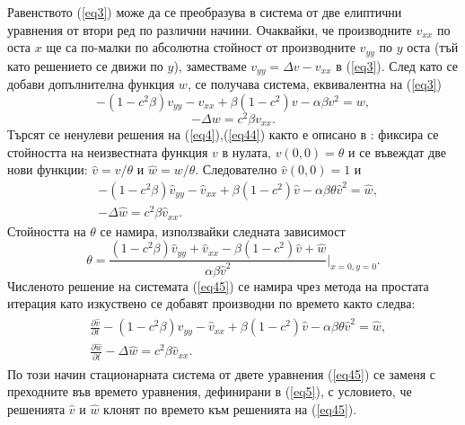 \documentclass[a4paper]{article}
\newcommand{\rf}[1]{(\ref{#1})}
\theoremstyle{remark}
\begin{document}
\begin{large}
Равенството \rf{eq3} може да се преобразува в система от две елиптични уравнения от втори ред по различни начини. Очаквайки, че производните $v_{xx}$ по оста $x$ ще са по-малки по абсолютна стойност от производните $v_{yy}$ по $y$ оста (тъй като решението се движи по $y$), заместваме $v_{yy} = \Delta v- v_{xx}$ в \rf{eq3}. След като се добави допълнителна функция $w$, се получава система, еквивалентна на \rf{eq3}
\begin{equation}\label{eq4}
- (1- c^2 \beta) v_{yy} - v_{xx} + \beta (1-c^2) v - \alpha \beta v^2 = w, 
\end{equation}
\begin{equation}\label{eq44}
 - \Delta w = c^2 \beta v_{xx}. 
\end{equation}
Търсят се ненулеви решения на \rf{eq4},\rf{eq44} както е описано в \cite{ref117,ref116}: фиксира се стойността на неизвестната функция $v$ в нулата, $v(0,0)=\theta$ и се въвеждат две нови функции: $\widehat{v}=v/{\theta} $ и $\widehat{w}=w/{\theta} $. Следователно $\widehat{v}(0,0)=1$ и 
\begin{equation}\label{eq45}
\begin{split}
 &- (1 - c^2 \beta) \widehat{v}_{yy} -\widehat{v}_{xx} + \beta (1-c^2) \widehat{v} - \alpha \beta \theta \widehat{v}^2 = \widehat{w}, \\
 &- \Delta \widehat{w} =  c^2 \beta \widehat{v}_{xx}.
\end{split}
\end{equation}
Стойността на $\theta$ се намира, използвайки следната зависимост
\begin{equation}\label{eqtheta}
\theta = \frac{ (1-c^2 \beta) \widehat{v}_{yy} + \widehat{v}_{xx} - \beta (1-c^2) \widehat{v} +\widehat{w}}{\alpha \beta \widehat{v}^2 } |_{x=0,y=0}.
\end{equation}
Численото решение на системата \rf{eq45} се намира чрез метода на простата итерация като изкуствено се добавят производни по времето както следва:
\begin{align}\label{eq5}
\begin{split}
 &\frac {\partial \widehat{v}}{\partial t} - (1 - c^2 \beta) \widehat{v}_{yy} -\widehat{v}_{xx} + \beta (1-c^2) \widehat{v} - \alpha \beta \theta \widehat{v}^2 = \widehat{w}, \\
 &\frac {\partial \widehat{w}}{\partial t} - \Delta \widehat{w} =  c^2 \beta \widehat{v}_{xx}. 
\end{split}
\end{align}
По този начин стационарната система от двете уравнения \rf{eq45} се заменя с преходните във времето уравнения, дефинирани в \rf{eq5}, с условието, че решенията $\widehat{v}$ и $\widehat{w}$ клонят по времето към решенията на \rf{eq45}.


\end{large}
\end{document}
